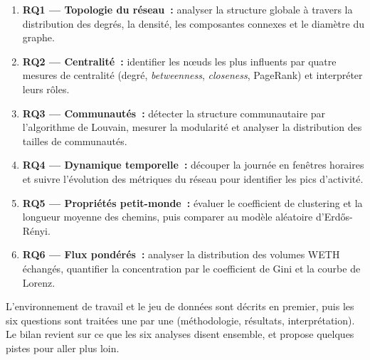 \begin{enumerate}
    \item \textbf{RQ1 --- Topologie du r\'eseau~:} analyser la structure globale
    \`a travers la distribution des degr\'es, la densit\'e, les composantes connexes
    et le diam\`etre du graphe.
    \item \textbf{RQ2 --- Centralit\'e~:} identifier les n\oe{}uds les plus
    influents par quatre mesures de centralit\'e (degr\'e, \textit{betweenness},
    \textit{closeness}, PageRank) et interpr\'eter leurs r\^oles.
    \item \textbf{RQ3 --- Communaut\'es~:} d\'etecter la structure communautaire
    par l'algorithme de Louvain, mesurer la modularit\'e et analyser la
    distribution des tailles de communaut\'es.
    \item \textbf{RQ4 --- Dynamique temporelle~:} d\'ecouper la journ\'ee en
    fen\^etres horaires et suivre l'\'evolution des m\'etriques du r\'eseau pour
    identifier les pics d'activit\'e.
    \item \textbf{RQ5 --- Propri\'et\'es petit-monde~:} \'evaluer le coefficient
    de clustering et la longueur moyenne des chemins, puis comparer au mod\`ele
    al\'eatoire d'Erd\H{o}s-R\'enyi.
    \item \textbf{RQ6 --- Flux pond\'er\'es~:} analyser la distribution des
    volumes WETH \'echang\'es, quantifier la concentration par le coefficient de
    Gini et la courbe de Lorenz.
\end{enumerate}

L'environnement de travail et le jeu de donn\'ees sont d\'ecrits en premier,
puis les six questions sont trait\'ees une par une (m\'ethodologie,
r\'esultats, interpr\'etation). Le bilan revient sur ce que les six analyses
disent ensemble, et propose quelques pistes pour aller plus loin.
